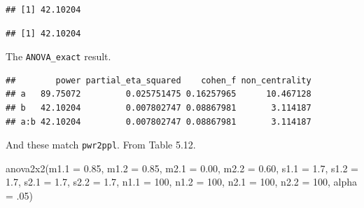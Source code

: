 \documentclass[
]{book}
\newenvironment{Shaded}{\begin{snugshade}}{\end{snugshade}}
\newcommand{\AttributeTok}[1]{\textcolor[rgb]{0.77,0.63,0.00}{#1}}
\newcommand{\ConstantTok}[1]{\textcolor[rgb]{0.00,0.00,0.00}{#1}}
\newcommand{\DecValTok}[1]{\textcolor[rgb]{0.00,0.00,0.81}{#1}}
\newcommand{\FloatTok}[1]{\textcolor[rgb]{0.00,0.00,0.81}{#1}}
\newcommand{\FunctionTok}[1]{\textcolor[rgb]{0.00,0.00,0.00}{#1}}
\newcommand{\NormalTok}[1]{#1}
\newcommand{\OtherTok}[1]{\textcolor[rgb]{0.56,0.35,0.01}{#1}}
\newcommand{\SpecialCharTok}[1]{\textcolor[rgb]{0.00,0.00,0.00}{#1}}
\begin{document}
\begin{verbatim}
## [1] 42.10204
\end{verbatim}

\begin{Shaded}
\end{Shaded}

\begin{verbatim}
## [1] 42.10204
\end{verbatim}

The \texttt{ANOVA\_exact} result.

\begin{Shaded}
\end{Shaded}

\begin{verbatim}
##        power partial_eta_squared    cohen_f non_centrality
## a   89.75072         0.025751475 0.16257965      10.467128
## b   42.10204         0.007802747 0.08867981       3.114187
## a:b 42.10204         0.007802747 0.08867981       3.114187
\end{verbatim}

And these match \texttt{pwr2ppl}. From Table 5.12.

\begin{Shaded}
\begin{Highlighting}[]
\FunctionTok{anova2x2}\NormalTok{(}\AttributeTok{m1.1 =} \FloatTok{0.85}\NormalTok{, }\AttributeTok{m1.2 =} \FloatTok{0.85}\NormalTok{, }\AttributeTok{m2.1 =} \FloatTok{0.00}\NormalTok{, }\AttributeTok{m2.2 =} \FloatTok{0.60}\NormalTok{,}
         \AttributeTok{s1.1 =} \FloatTok{1.7}\NormalTok{, }\AttributeTok{s1.2 =} \FloatTok{1.7}\NormalTok{, }\AttributeTok{s2.1 =} \FloatTok{1.7}\NormalTok{, }\AttributeTok{s2.2 =} \FloatTok{1.7}\NormalTok{,}
         \AttributeTok{n1.1 =} \DecValTok{100}\NormalTok{, }\AttributeTok{n1.2 =} \DecValTok{100}\NormalTok{, }\AttributeTok{n2.1 =} \DecValTok{100}\NormalTok{, }\AttributeTok{n2.2 =} \DecValTok{100}\NormalTok{,}
         \AttributeTok{alpha =}\NormalTok{ .}\DecValTok{05}\NormalTok{)}
\end{Highlighting}
\end{Shaded}
\end{document}
